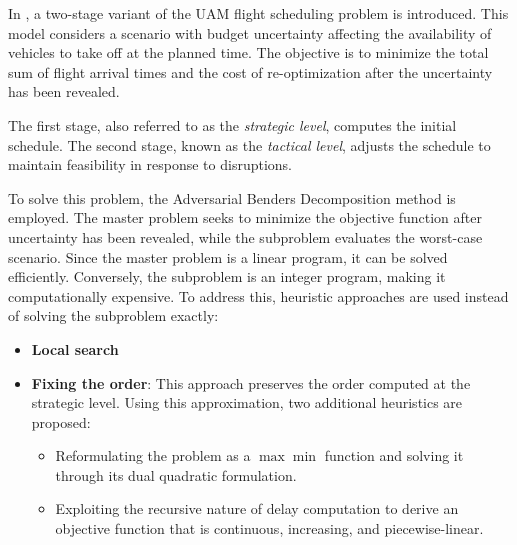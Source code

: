 \documentclass[../../thesis.tex]{subfiles}
\begin{document}
In \cite{portoleau-2024}, a two-stage variant of the UAM flight scheduling problem is introduced.  
This model considers a scenario with budget uncertainty affecting the availability of vehicles to take off at the planned time. The objective is to minimize the total sum of flight arrival times and the cost of re-optimization after the uncertainty has been revealed.  

The first stage, also referred to as the \textit{strategic level}, computes the initial schedule.  
The second stage, known as the \textit{tactical level}, adjusts the schedule to maintain feasibility in response to disruptions.  

To solve this problem, the Adversarial Benders Decomposition method is employed.  
The master problem seeks to minimize the objective function after uncertainty has been revealed, while the subproblem evaluates the worst-case scenario.  
Since the master problem is a linear program, it can be solved efficiently. Conversely, the subproblem is an integer program, making it computationally expensive. To address this, heuristic approaches are used instead of solving the subproblem exactly:  
\begin{itemize}
    \item \textbf{Local search}
    \item \textbf{Fixing the order}: This approach preserves the order computed at the strategic level.  
    Using this approximation, two additional heuristics are proposed:  
    \begin{itemize}
        \item Reformulating the problem as a $\max\min$ function and solving it through its dual quadratic formulation.  
        \item Exploiting the recursive nature of delay computation to derive an objective function that is continuous, increasing, and piecewise-linear.  
    \end{itemize}
\end{itemize}
\end{document}
